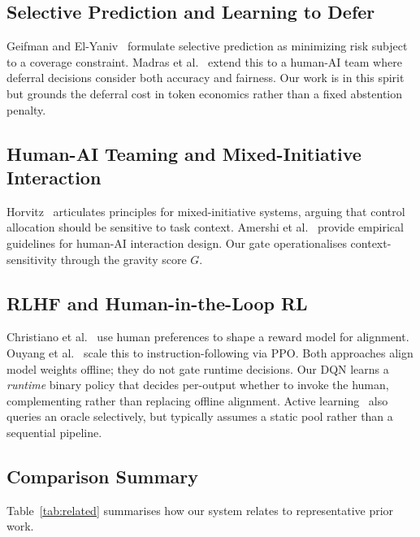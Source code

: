 \documentclass[conference]{IEEEtran}
\begin{document}
\subsection{Selective Prediction and Learning to Defer}
Geifman and El-Yaniv~\cite{geifman2017selective} formulate selective
prediction as minimizing risk subject to a coverage constraint.
Madras et al.~\cite{madras2018predict} extend this to a human-AI team where
deferral decisions consider both accuracy and fairness.
Our work is in this spirit but grounds the deferral cost in token economics
rather than a fixed abstention penalty.

\subsection{Human-AI Teaming and Mixed-Initiative Interaction}
Horvitz~\cite{horvitz1999principles} articulates principles for
mixed-initiative systems, arguing that control allocation should be
sensitive to task context.
Amershi et al.~\cite{amershi2019guidelines} provide empirical guidelines
for human-AI interaction design.
Our gate operationalises context-sensitivity through the gravity score $G$.

\subsection{RLHF and Human-in-the-Loop RL}
Christiano et al.~\cite{christiano2017rlhf} use human preferences to
shape a reward model for alignment.
Ouyang et al.~\cite{ouyang2022instructgpt} scale this to instruction-following
via PPO.
Both approaches align model weights offline; they do not gate runtime
decisions.
Our DQN learns a \emph{runtime} binary policy that decides per-output
whether to invoke the human, complementing rather than replacing offline
alignment.
Active learning~\cite{settles2012active} also queries an oracle selectively,
but typically assumes a static pool rather than a sequential pipeline.

\subsection{Comparison Summary}

Table~\ref{tab:related} summarises how our system relates to representative
prior work.
\end{document}
